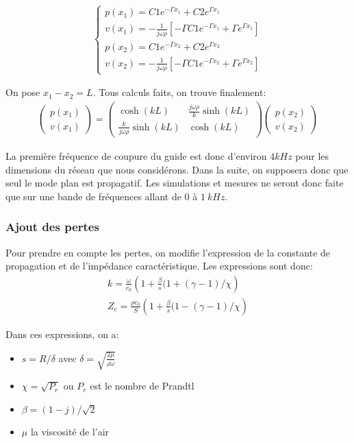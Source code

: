 \begin{eqnarray*}
\begin{cases}
p(x_1)  =  C1 e^{-\Gamma x_1} + C2 e^{\Gamma x_1} \\
v(x_1)  =  -\frac{1}{j\omega\rho} [ -\Gamma C1 e^{-\Gamma x_1} + \Gamma e^{\Gamma x_1}]\\
p(x_2)  =  C1 e^{-\Gamma x_2} + C2 e^{\Gamma x_2} \\
v(x_2)  =  -\frac{1}{j\omega\rho} [ -\Gamma C1 e^{-\Gamma x_2} + \Gamma e^{\Gamma x_2}]
\end{cases}
\end{eqnarray*}
 
On pose $x_1 - x_2 = L$. Tous calculs faits, on trouve finalement:
\begin{eqnarray*}
\begin{pmatrix} p(x_1) \\ v(x_1) \end{pmatrix} = \begin{pmatrix} \cosh(kL) & \frac{j\omega\rho}{k} \sinh(k L) \\  \frac{k}{j\omega\rho}\sinh(k L) & \cosh(k L) \end{pmatrix} \begin{pmatrix} p(x_2) \\ v(x_2) \end{pmatrix}
\end{eqnarray*}

La première fréquence de coupure du guide est donc d'environ $4kHz$ pour les dimensions du réseau que nous considérons. Dans la suite, on supposera donc que seul le mode plan est propagatif. Les simulations et mesures ne seront donc faite que sur une bande de fréquences allant de $0$ à $1~kHz$.

\subsubsection{Ajout des pertes}

Pour prendre en compte les pertes, on modifie l'expression de la constante de propagation et de l'impédance caractéristique. Les expressions sont donc:
\begin{eqnarray*}
 k =  \frac{\omega}{c_0} \left( 1 + \frac{\beta}{s}(1+(\gamma-1)/ \chi \right) \\
 Z_c =  \frac{\rho c_0}{S} \left( 1 + \frac{\beta}{s}(1-(\gamma-1)/ \chi \right) 
\end{eqnarray*}

Dans ces expressions, on a:
\begin{itemize}
 \item  $s=R/ \delta$ avec $\delta = \sqrt{\frac{2 \mu}{\rho \omega}}$
 \item  $\chi = \sqrt{P_r}$ ou $P_r$ est le nombre de Prandtl
 \item $\beta = (1-j)/\sqrt{2}$ 
 \item $\mu$ la viscosité de l'air
\end{itemize}

